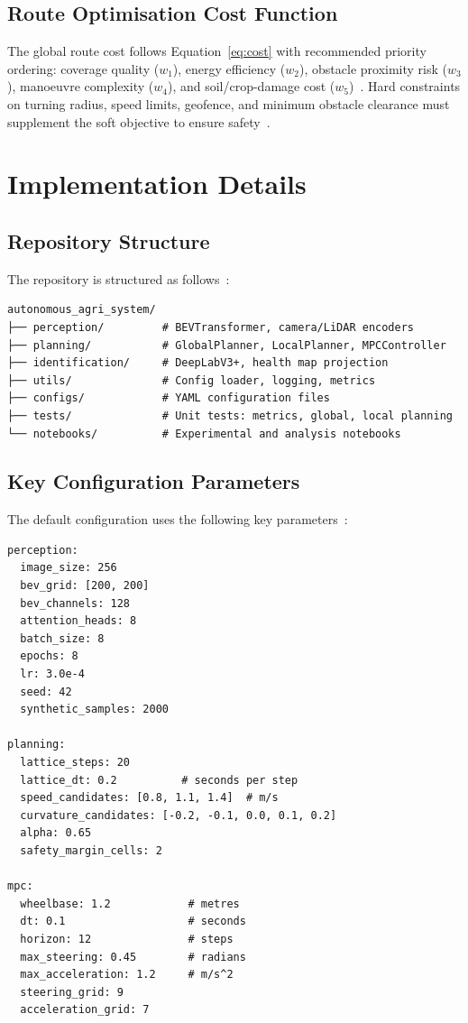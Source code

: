 \documentclass[12pt, a4paper]{article}
\begin{document}
\section{Route Optimisation Cost Function}

The global route cost follows Equation~\eqref{eq:cost} with recommended priority ordering:
coverage quality ($w_1$), energy efficiency ($w_2$), obstacle proximity risk ($w_3$),
manoeuvre complexity ($w_4$), and soil/crop-damage cost ($w_5$)~\cite{ref1, ref2}. Hard
constraints on turning radius, speed limits, geofence, and minimum obstacle clearance must
supplement the soft objective to ensure safety~\cite{ref2}.

\chapter{Implementation Details}
\label{app:impl}

\section{Repository Structure}

The repository is structured as follows~\cite{ref234}:

\begin{verbatim}
autonomous_agri_system/
├── perception/         # BEVTransformer, camera/LiDAR encoders
├── planning/           # GlobalPlanner, LocalPlanner, MPCController
├── identification/     # DeepLabV3+, health map projection
├── utils/              # Config loader, logging, metrics
├── configs/            # YAML configuration files
├── tests/              # Unit tests: metrics, global, local planning
└── notebooks/          # Experimental and analysis notebooks
\end{verbatim}

\section{Key Configuration Parameters}

The default configuration uses the following key parameters~\cite{ref234}:

\begin{verbatim}
perception:
  image_size: 256
  bev_grid: [200, 200]
  bev_channels: 128
  attention_heads: 8
  batch_size: 8
  epochs: 8
  lr: 3.0e-4
  seed: 42
  synthetic_samples: 2000

planning:
  lattice_steps: 20
  lattice_dt: 0.2          # seconds per step
  speed_candidates: [0.8, 1.1, 1.4]  # m/s
  curvature_candidates: [-0.2, -0.1, 0.0, 0.1, 0.2]
  alpha: 0.65
  safety_margin_cells: 2

mpc:
  wheelbase: 1.2            # metres
  dt: 0.1                   # seconds
  horizon: 12               # steps
  max_steering: 0.45        # radians
  max_acceleration: 1.2     # m/s^2
  steering_grid: 9
  acceleration_grid: 7
\end{verbatim}
\end{document}
